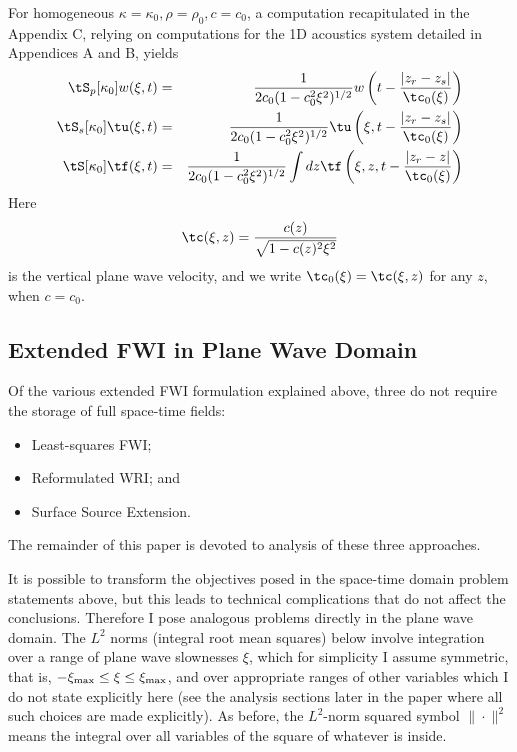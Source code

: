 For homogeneous $\kappa=\kappa_0, \rho=\rho_0, c=c_0$, a computation
recapitulated in the Appendix C, relying on computations for the 1D
acoustics system detailed in Appendices A and B, yields
\begin{eqnarray}
  \label{eqn:ptmodhompw}
  \tS_p[\kappa_0]w(\xi,t) & = &\frac{1}{2c_0(1-c_0^2\xi^2)^{1/2}}w
                                \left(t-\frac{|z_r-z_s|}{\tc_0(\xi)}\right)\\
    \label{eqn:ssmodhompw}
  \tS_s[\kappa_0]\tu(\xi,t) & = &\frac{1}{2c_0(1-c_0^2\xi^2)^{1/2}}\tu 
                                  \left(\xi,t-\frac{|z_r-z_s|}{\tc_0(\xi)}\right)\\
    \label{eqn:stmodhompw}
  \tS[\kappa_0]\tf(\xi,t) & = &  \frac{1}{2c_0(1-c_0^2\xi^2)^{1/2}}\int dz \tf\left(\xi,z,t -
                                \frac{|z_r-z|}{\tc_0(\xi)}\right)                              
\end{eqnarray}
Here
\begin{equation}
  \label{eqn:vertvel}
  \tc(\xi,z) = \frac{c(z)}{\sqrt{1-c(z)^2\xi^2}}
    \end{equation}
is the vertical plane wave velocity, and we write
$\tc_0(\xi)=\tc(\xi,z)$ for any $z$, when $c=c_0$.

\subsection{Extended FWI in Plane Wave Domain}
Of the various extended FWI formulation explained above, three do not
require the storage of full space-time fields:
\begin{itemize}
\item Least-squares FWI;
\item Reformulated WRI; and
\item Surface Source Extension.
\end{itemize}
The remainder of this paper is devoted to analysis of these three
approaches.

It is possible to transform the objectives posed in the space-time
domain problem statements above, but this leads to technical
complications that do not affect the conclusions. Therefore I pose
analogous problems directly in the plane wave domain. The $L^2$ norms
(integral root mean squares) below involve integration over a range of
plane wave slownesses $\xi$, which for simplicity I assume symmetric,
that is, $-\xi_{\rm max} \le \xi \le \xi_{\rm max}$, and over
appropriate ranges of other variables which I do not state explicitly
here (see the analysis sections later in the paper where all such
choices are made explicitly). As before, the $L^2$-norm squared symbol
$\|\cdot\|^2$ means the integral over all variables of the square of
whatever is inside.

